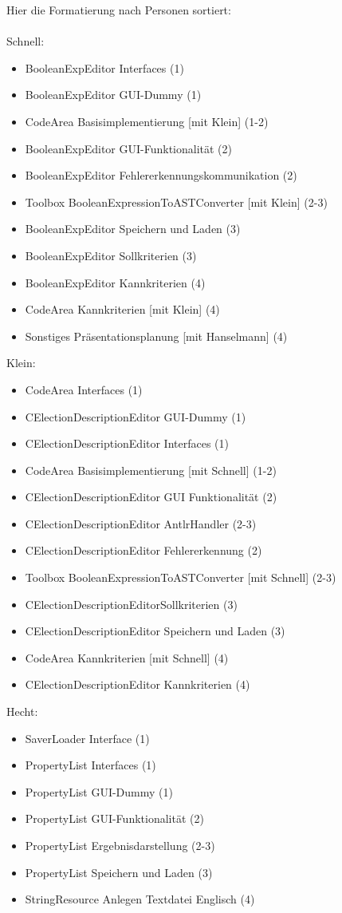 \documentclass[a4paper]{scrreprt}
\begin{document}
Hier die Formatierung nach Personen sortiert: \\\\
Schnell:
\begin{itemize} 
\item BooleanExpEditor Interfaces (1)
\item BooleanExpEditor GUI-Dummy (1)
\item CodeArea Basisimplementierung [mit Klein] (1-2)
\item BooleanExpEditor GUI-Funktionalität (2)
\item BooleanExpEditor Fehlererkennungskommunikation (2) 
\item Toolbox BooleanExpressionToASTConverter [mit Klein] (2-3) 
\item BooleanExpEditor Speichern und Laden (3) 
\item BooleanExpEditor Sollkriterien (3)
\item BooleanExpEditor Kannkriterien (4)
\item CodeArea Kannkriterien [mit Klein] (4)
\item Sonstiges Präsentationsplanung [mit Hanselmann] (4)
\end{itemize} 
\vspace{8mm}
Klein: 
\begin{itemize}
\item CodeArea Interfaces (1)
\item CElectionDescriptionEditor GUI-Dummy (1) 
\item CElectionDescriptionEditor Interfaces (1)
\item CodeArea Basisimplementierung [mit Schnell] (1-2)
\item CElectionDescriptionEditor GUI Funktionalität (2)
\item CElectionDescriptionEditor AntlrHandler (2-3)
\item CElectionDescriptionEditor Fehlererkennung (2) 
\item Toolbox BooleanExpressionToASTConverter [mit Schnell] (2-3) 
\item CElectionDescriptionEditorSollkriterien (3)
\item CElectionDescriptionEditor Speichern und Laden (3)
\item CodeArea Kannkriterien [mit Schnell] (4)
\item CElectionDescriptionEditor Kannkriterien (4)
\end{itemize} 
\vspace{8mm}
Hecht: 
\begin{itemize}
\item SaverLoader Interface (1)
\item PropertyList Interfaces (1)
\item PropertyList GUI-Dummy (1)
\item PropertyList GUI-Funktionalität (2)
\item PropertyList Ergebnisdarstellung (2-3)
\item PropertyList Speichern und Laden (3)
\item StringResource Anlegen Textdatei Englisch (4)
\end{itemize} 
\end{document}
